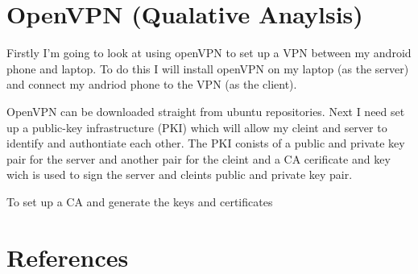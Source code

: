 \documentclass[12pt,a4paper,oneside]{article}
\begin{document}
\section{OpenVPN (Qualative Anaylsis)}
Firstly I'm going to look at using openVPN to set up a VPN between my android phone and laptop. To do this I will install openVPN on my laptop (as the server) and connect my andriod phone to the VPN (as the client). 

OpenVPN can be downloaded straight from ubuntu repositories. Next I need set up a public-key infrastructure (PKI) which will allow my cleint and server to identify and authontiate each other. The PKI conists of a public and private key pair for the server and another pair for the cleint and a CA cerificate and key wich is used to sign the server and cleints public and private key pair. 

To set up a CA and generate the keys and certificates

\section{References}
\end{document}
